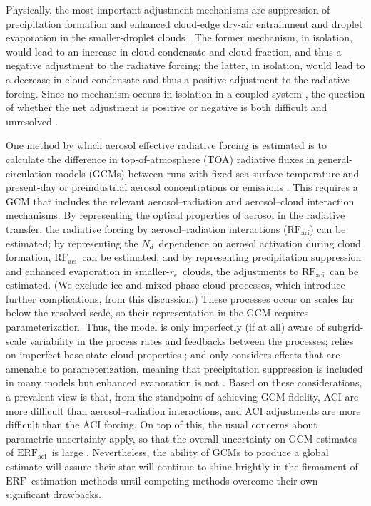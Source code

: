 \documentclass[acp, manuscript]{copernicus}\usepackage[]{graphicx}\usepackage[]{color}
\newcommand\nd{\ensuremath{N_d}}
\newcommand\re{\ensuremath{r_e}}
\newcommand\erf{\ensuremath{\text{ERF}}}
\newcommand\erfaci{\ensuremath{\text{ERF}_\text{aci}}}
\newcommand\rfaci{\ensuremath{\text{RF}_\text{aci}}}
\newcommand\rfari{\ensuremath{\text{RF}_\text{ari}}}
\begin{document}
Physically, the most important adjustment mechanisms are suppression of
precipitation formation \citep{Albrecht1989} and enhanced cloud-edge dry-air
entrainment and droplet evaporation in the smaller-droplet clouds
\citep{Ackerman04}.  The former mechanism, in isolation, would lead to an
increase in cloud condensate and cloud fraction, and thus a negative adjustment to the radiative
forcing; the latter, in isolation, would lead to a decrease in cloud condensate
and thus a positive adjustment to the radiative forcing.  Since no mechanism
occurs in isolation in a coupled system \citep{Stevens2009}, the question of
whether the net adjustment is positive or negative is both difficult and
unresolved
\citep[e.g.,][]{Muelmenstaedt2018,Gryspeerdt2019a}.

One method by which aerosol effective radiative forcing is estimated is to
calculate the difference in top-of-atmosphere (TOA) radiative fluxes in
general-circulation models (GCMs) between runs with fixed sea-surface
temperature and present-day or preindustrial aerosol concentrations or emissions
\citep[e.g.,][]{Lohmann2010,Forster2016}.  This requires a GCM that includes the
relevant aerosol--radiation and aerosol--cloud interaction mechanisms. By
representing the optical properties of aerosol in the radiative transfer, the
radiative forcing by aerosol--radiation interactions (\rfari) can be estimated;
by representing the \nd\ dependence on aerosol activation during cloud
formation, \rfaci\ can be estimated; and by representing precipitation
suppression and enhanced evaporation in smaller-\re\ clouds, the adjustments to
\rfaci\ can be estimated.  (We exclude ice and mixed-phase cloud processes,
which introduce further complications, from this discussion.) These processes
occur on scales far below the resolved scale, so their representation in the GCM
requires parameterization.  Thus, the model is only imperfectly (if at all)
aware of subgrid-scale variability in the process rates and feedbacks between
the processes; relies on imperfect base-state cloud properties
\citep[e.g.,][]{Penner2006}; and only considers effects that are amenable to
parameterization, meaning that precipitation suppression is included in many
models but enhanced evaporation is not
\citep[e.g.,][]{Salzmann2010,Michibata2016,Zhou2017}.  Based on these
considerations, a prevalent view is that, from the standpoint of achieving GCM
fidelity, ACI are more difficult than aerosol--radiation interactions, and ACI
adjustments are more difficult than the ACI forcing.  On top of this, the usual
concerns about parametric uncertainty apply, so that the overall uncertainty on
GCM estimates of \erfaci\ is large \citep{Boucher2013}.  Nevertheless, the
ability of GCMs to produce a global estimate will assure their star will
continue to shine brightly in the firmament of \erf\ estimation methods until
competing methods overcome their own significant drawbacks.
\end{document}
